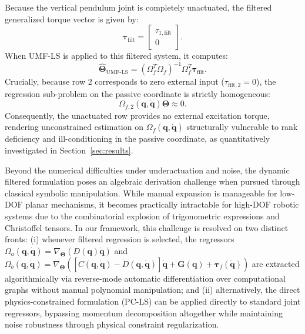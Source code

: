 \documentclass[lettersize,journal]{IEEEtran}
\begin{document}
Because the vertical pendulum joint is completely unactuated, the filtered generalized torque vector is given by:
\begin{equation}
    \bm{\tau}_{\text{filt}} = \begin{bmatrix} \tau_{1,\text{filt}} \\ 0 \end{bmatrix}.
    \label{eq:furuta_filtered_tau}
\end{equation}
When UMF-LS \cite{AguilarSierra2014} is applied to this filtered system, it computes:
\begin{equation}
    \hat{\bm{\Theta}}_{\text{UMF-LS}} = \left(\Omega_f^T \Omega_f\right)^{-1} \Omega_f^T \bm{\tau}_{\text{filt}}.
    \label{eq:furuta_mfls_solution}
\end{equation}
Crucially, because row 2 corresponds to zero external input ($\tau_{\text{filt},2} = 0$), the regression sub-problem on the passive coordinate is strictly homogeneous:
\begin{equation}
    \Omega_{f,2}(\bm{q}, \dot{\bm{q}})\bm{\Theta} \approx 0.
    \label{eq:furuta_homog}
\end{equation}
Consequently, the unactuated row provides no external excitation torque, rendering unconstrained estimation on $\Omega_f(\bm{q}, \dot{\bm{q}})$ structurally vulnerable to rank deficiency and ill-conditioning in the passive coordinate, as quantitatively investigated in Section~\ref{sec:results}.

Beyond the numerical difficulties under underactuation and noise, the dynamic filtered formulation poses an algebraic derivation challenge when pursued through classical symbolic manipulation. While manual expansion is manageable for low-DOF planar mechanisms, it becomes practically intractable for high-DOF robotic systems due to the combinatorial explosion of trigonometric expressions and Christoffel tensors. In our framework, this challenge is resolved on two distinct fronts: (i) whenever filtered regression is selected, the regressors $\Omega_a(\bm{q}, \dot{\bm{q}}) = \nabla_{\bm{\Theta}}(D(\bm{q})\dot{\bm{q}})$ and $\Omega_b(\bm{q}, \dot{\bm{q}}) = \nabla_{\bm{\Theta}}([C(\bm{q},\dot{\bm{q}})-\dot{D}(\bm{q},\dot{\bm{q}})]\dot{\bm{q}} + \bm{G}(\bm{q}) + \bm{\tau}_f(\dot{\bm{q}}))$ are extracted algorithmically via reverse-mode automatic differentiation over computational graphs without manual polynomial manipulation; and (ii) alternatively, the direct physics-constrained formulation (PC-LS) can be applied directly to standard joint regressors, bypassing momentum decomposition altogether while maintaining noise robustness through physical constraint regularization.
\end{document}
